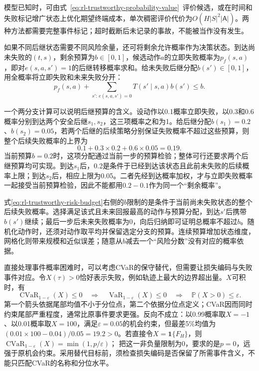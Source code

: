 模型已知时，可由式~\eqref{eq:rl-trustworthy-probability-value}~评价候选，或在时间和失败标记增广状态上优化期望终端成本，单次稠密评价代价为$O(H|S|^2|\mathsf A|)$。两种方法都需要完整事件标记；超时截断后未记录的事故，不能被当作没有发生。

如果不同后继状态需要不同风险余量，还可将剩余允许概率作为决策状态。到达尚未失败的$(t,s)$，剩余预算为$b\in[0,1]$，候选动作$a$的立即失败概率为$p_f(s,a)$，即对$e(s,a,s')=1$的后继转移概率求和。给未失败后继分配$b(s')\in[0,1]$，用全概率将立即失败和未来失败分开：
\begin{equation}
  p_f(s,a)+
    \sum_{s':\,e(s,a,s')=0}T(s'\mid s,a)b(s')\leq b.
  \label{eq:rl-trustworthy-risk-budget}
\end{equation}
\begin{samepage}
一个两分支计算可以说明后继预算的含义。设动作以0.1概率立即失败，以0.3和0.6概率分别到达两个安全后继$s_1,s_2$，这三项概率之和为1。给后继分配$b(s_1)=0.2$、$b(s_2)=0.05$，若两个后继的后续策略分别保证失败概率不超过这些预算，则整个后续失败概率的上界为
\[
  0.1+0.3\times0.2+0.6\times0.05=0.19.
\]
当前预算$b=0.2$时，这项分配通过当前一步的预算检验；整体可行还要求两个后继预算均可实现。到达$s_1$后，0.2是条件于已经到达该状态且此前未失败的后续概率上限；到达$s_2$后，相应上限为0.05。二者先经到达概率加权，才与立即失败概率一起接受当前预算检验，因此不能都用$0.2-0.1$作为同一个“剩余概率”。
\par
\end{samepage}

式\eqref{eq:rl-trustworthy-risk-budget}右侧的$b$限制的是条件于当前尚未失败状态的整个后续失败概率。选择满足该式且未来回报最高的动作与预算分配，到达$s'$后携带$b(s')$继续；最后一步后未来失败概率为0，向后归纳即可证明总概率不超过$b$。随机化动作时，还须对动作取平均并保留选定分支的预算。连续预算增加状态维度，网格化则带来规模和近似误差；随意从$b$减去一个“风险分数”没有对应的概率依据。

直接处理事件概率困难时，可以考虑CVaR的保守替代，但需要让损失编码与失败事件对应。令$X(\tau)>0$恰好表示失败，例如轨迹上最大的边界超出量。$X$可积时，有
\[
  \operatorname{CVaR}_{1-\varepsilon}(X)\leq0
  \quad\Longrightarrow\quad
  \operatorname{VaR}_{1-\varepsilon}(X)\leq0
  \quad\Longrightarrow\quad
  \mathbb P(X>0)\leq\varepsilon.
\]
第一个箭头依据尾部均值不小于分位点，第二个依据分位点定义；CVaR因而同时约束尾部严重程度，通常比原事件要求更强。反向不成立：以0.99概率取$X=-1$、以0.01概率取$X=100$，满足$\varepsilon=0.05$的机会约束，但最差5\%均值为
$(0.01\times100-0.04)/0.05=19.2>0$。若直接令$X=\mathbf1\{F_H\}$，则
$\operatorname{CVaR}_{1-\varepsilon}(X)=\min(1,p/\varepsilon)$；
把这一非负量限制为0，要求的是$p=0$，远强于原机会约束。采用替代目标前，须检查损失编码是否保留了所需事件含义，不能只匹配CVaR的名称和分位水平。

